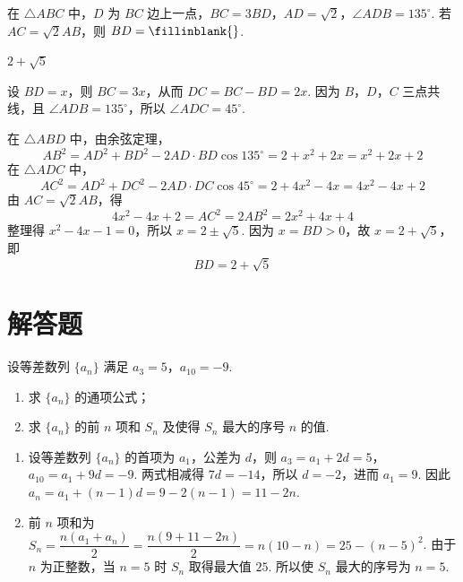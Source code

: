 \begin{problem}
在 \(\triangle ABC\) 中，\(D\) 为 \(BC\) 边上一点，\(BC = 3BD\)，\(AD = \sqrt{2}\)，\(\angle ADB = 135^{\circ}\). 若 \(AC = \sqrt{2}AB\)，则 \(BD =\fillinblank{}\).
\end{problem}

\begin{answer}
\(2+\sqrt{5}\)
\end{answer}

\begin{solution}
设 \(BD=x\)，则 \(BC=3x\)，从而 \(DC=BC-BD=2x\). 因为 \(B\)，\(D\)，\(C\) 三点共线，且 \(\angle ADB=135^{\circ}\)，所以 \(\angle ADC=45^{\circ}\).

在 \(\triangle ABD\) 中，由余弦定理，
\[
AB^{2}=AD^{2}+BD^{2}-2AD\cdot BD\cos135^{\circ}
=2+x^{2}+2x=x^{2}+2x+2
\]
在 \(\triangle ADC\) 中，
\[
AC^{2}=AD^{2}+DC^{2}-2AD\cdot DC\cos45^{\circ}
=2+4x^{2}-4x=4x^{2}-4x+2
\]
由 \(AC=\sqrt{2}AB\)，得
\[
4x^{2}-4x+2=AC^{2}=2AB^{2}=2x^{2}+4x+4
\]
整理得 \(x^{2}-4x-1=0\)，所以 \(x=2\pm\sqrt{5}\). 因为 \(x=BD>0\)，故 \(x=2+\sqrt{5}\)，即
\[
BD=2+\sqrt{5}
\]
\end{solution}

\section{解答题}

\begin{problem}
设等差数列 \(\{a_{n}\}\) 满足 \(a_{3} = 5\)，\(a_{10} = -9\).

\begin{enumerate}
\item 求 \(\{a_{n}\}\) 的通项公式；
\item 求 \(\{a_{n}\}\) 的前 \(n\) 项和 \(S_{n}\) 及使得 \(S_{n}\) 最大的序号 \(n\) 的值.
\end{enumerate}
\end{problem}

\begin{solution}
\begin{enumerate}
\item 设等差数列 \(\{a_n\}\) 的首项为 \(a_1\)，公差为 \(d\)，则 \(a_3=a_1+2d=5\)，\(a_{10}=a_1+9d=-9\). 两式相减得 \(7d=-14\)，所以 \(d=-2\)，进而 \(a_1=9\). 因此 \(a_n=a_1+(n-1)d=9-2(n-1)=11-2n\).

\item 前 \(n\) 项和为 \(S_n=\dfrac{n(a_1+a_n)}{2}=\dfrac{n(9+11-2n)}{2}=n(10-n)=25-(n-5)^2\). 由于 \(n\) 为正整数，当 \(n=5\) 时 \(S_n\) 取得最大值 \(25\). 所以使 \(S_n\) 最大的序号为 \(n=5\).
\end{enumerate}
\end{solution}

